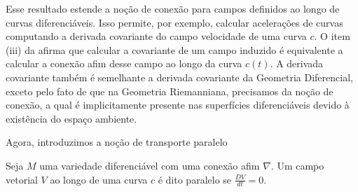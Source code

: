 Esse resultado estende a noção de conexão para campos definidos ao longo de curvas diferenciáveis. Isso permite, por exemplo, calcular acelerações de curvas computando a derivada covariante do campo velocidade de uma curva $c$.
O item (iii) da  afirma que calcular a covariante de um campo induzido é equivalente a calcular a conexão afim desse campo ao longo da curva $c(t)$. A derivada covariante também é semelhante a derivada covariante da Geometria Diferencial, exceto pelo fato de que na Geometria Riemanniana, precisamos da noção de conexão, a qual é implicitamente presente nas superfícies diferenciáveis devido à existência do espaço ambiente.

Agora, introduzimos a noção de transporte paralelo
\begin{definition}
	\label{def:paralelismo}
	Seja $M$ uma variedade diferenciável com uma conexão afim $\nabla$. Um campo vetorial $V$ ao longo de uma curva $c$ é dito paralelo se $\frac{DV}{dt}=0$.
\end{definition}

